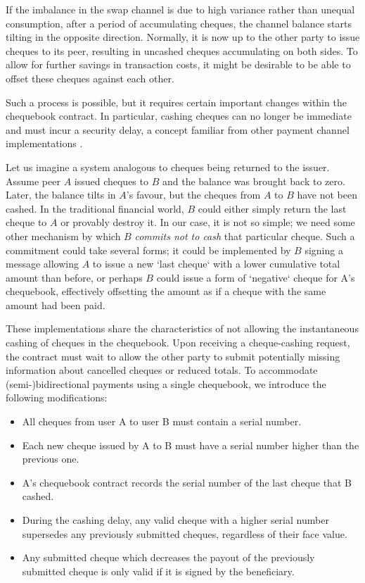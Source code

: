 If the imbalance in the swap channel is due to high variance rather than unequal consumption, after a period of accumulating cheques, the channel balance starts tilting in the opposite direction. Normally, it is now up to the other party to issue cheques to its peer, resulting in uncashed cheques accumulating on both sides.
To allow for further savings in transaction costs, it might be desirable to be able to offset these cheques against each other.

Such a process is possible, but it requires certain important changes within the chequebook contract. In particular, cashing cheques can no longer be immediate and must incur a security delay, a concept familiar from other payment channel implementations \citep{poon2015bitcoin, diferrante2017payment, mcdonald2017payment, tremback2015universal}. 

Let us imagine a system analogous to cheques being returned to the issuer. Assume peer $A$ issued cheques to $B$ and the balance was brought back to zero. Later, the balance tilts in $A$'s favour, but the cheques from $A$ to $B$ have not been cashed. In the traditional financial world, $B$ could either simply return the last cheque to $A$ or provably destroy it. In our case, it is not so simple; we need some other mechanism by which $B$ \emph{commits not to cash} that particular cheque. Such a commitment could take several forms; it could be implemented by $B$ signing a message allowing $A$ to issue a new `last cheque` with a lower cumulative total amount than before, or perhaps $B$ could issue a form of `negative` cheque for A's chequebook, effectively offsetting the amount as if a cheque with the same amount had been paid. 

These implementations share the characteristics of not allowing the instantaneous cashing of cheques in the chequebook. Upon receiving a cheque-cashing request, the contract must wait to allow the other party to submit potentially missing information about cancelled cheques or reduced totals. To accommodate (semi-)bidirectional payments using a single chequebook, we introduce the following modifications:

\begin{itemize}[noitemsep]
    \item All cheques from user A to user B must contain a serial number.
    \item Each new cheque issued by A to B must have a serial number higher than the previous one.
    \item A's chequebook contract records the serial number of the last cheque that B cashed.
    \item During the cashing delay, any valid cheque with a higher serial number supersedes any previously submitted cheques, regardless of their face value.
    \item Any submitted cheque which decreases the payout of the previously submitted cheque is only valid if it is signed by the beneficiary.
\end{itemize}


